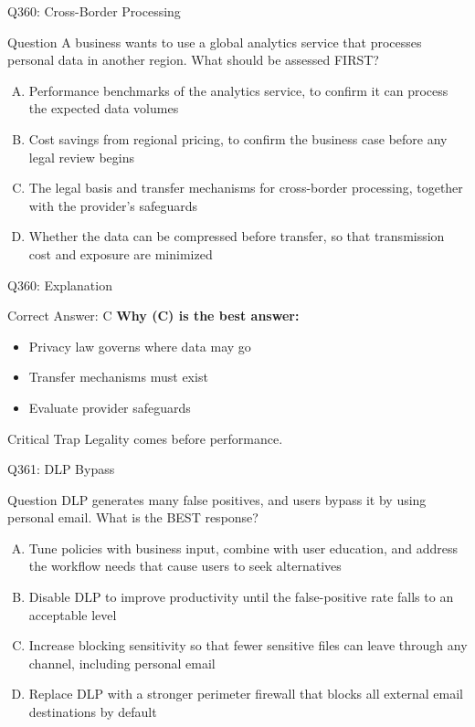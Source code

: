 \documentclass{beamer}
\begin{document}
	\begin{frame}{Q360: Cross-Border Processing}
		\begin{block}{Question}
			\small A business wants to use a global analytics service that processes personal data in another region. What should be assessed FIRST?
		\end{block}
		\begin{enumerate}[(A)]
			\footnotesize
			\item Performance benchmarks of the analytics service, to confirm it can process the expected data volumes
			\item Cost savings from regional pricing, to confirm the business case before any legal review begins
			\item The legal basis and transfer mechanisms for cross-border processing, together with the provider's safeguards
			\item Whether the data can be compressed before transfer, so that transmission cost and exposure are minimized
		\end{enumerate}
	\end{frame}
	
	\begin{frame}{Q360: Explanation}
		\begin{block}{Correct Answer: C}
			\textbf{Why (C) is the best answer:}
			\begin{itemize}
				\item Privacy law governs where data may go
				\item Transfer mechanisms must exist
				\item Evaluate provider safeguards
			\end{itemize}
		\end{block}
		\begin{alertblock}{Critical Trap}
			Legality comes before performance.
		\end{alertblock}
	\end{frame}
	
	\begin{frame}{Q361: DLP Bypass}
		\begin{block}{Question}
			\small DLP generates many false positives, and users bypass it by using personal email. What is the BEST response?
		\end{block}
		\begin{enumerate}[(A)]
			\footnotesize
			\item Tune policies with business input, combine with user education, and address the workflow needs that cause users to seek alternatives
			\item Disable DLP to improve productivity until the false-positive rate falls to an acceptable level
			\item Increase blocking sensitivity so that fewer sensitive files can leave through any channel, including personal email
			\item Replace DLP with a stronger perimeter firewall that blocks all external email destinations by default
		\end{enumerate}
	\end{frame}
	
\end{document}
